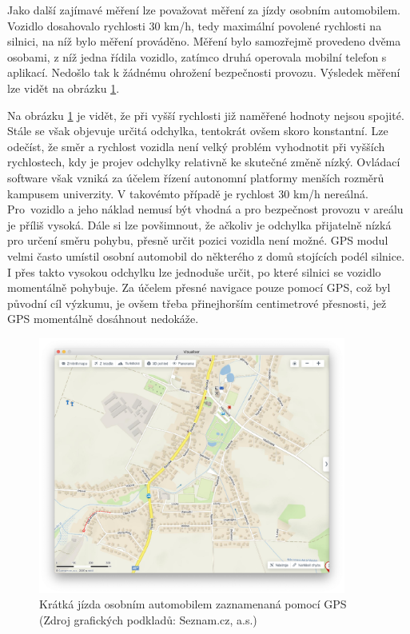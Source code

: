 \documentclass[czech, bachelor]{diploma}
\begin{document}
Jako další zajímavé měření lze považovat měření za jízdy osobním automobilem. Vozidlo dosahovalo rychlosti 30 km/h, tedy maximální
povolené rychlosti na silnici, na níž bylo měření prováděno. Měření bylo samozřejmě provedeno dvěma osobami, z níž
jedna řídila vozidlo, zatímco druhá operovala mobilní telefon s aplikací. Nedošlo tak k žádnému ohrožení bezpečnosti provozu.
Výsledek měření lze vidět na obrázku \ref{fig:olsinaautem}.

Na obrázku \ref{fig:olsinaautem} je vidět, že při vyšší rychlosti již naměřené hodnoty nejsou spojité. Stále se však objevuje
určitá odchylka, tentokrát ovšem skoro konstantní. Lze odečíst, že směr a rychlost vozidla není velký problém vyhodnotit při
vyšších rychlostech, kdy je projev odchylky relativně ke skutečné změně nízký. Ovládací software však vzniká za účelem řízení
autonomní platformy menších rozměrů kampusem univerzity. V takovémto případě je rychlost 30 km/h nereálná. Pro~vozidlo a jeho
náklad nemusí být vhodná a pro bezpečnost provozu v areálu je příliš vysoká. Dále si lze povšimnout, že ačkoliv je odchylka
přijatelně nízká pro určení směru pohybu, přesně určit pozici vozidla není možné. GPS modul velmi často umístil osobní automobil
do některého z domů stojících podél silnice. I přes takto vysokou odchylku lze jednoduše určit, po které silnici se vozidlo
momentálně pohybuje. Za účelem přesné navigace pouze pomocí GPS, což byl původní cíl výzkumu, je ovšem třeba přinejhorším
centimetrové přesnosti, jež GPS momentálně dosáhnout nedokáže.

\begin{figure}
    \centering
    \includegraphics[width=0.9\textwidth]{Figures/olsinaautem.png}
    \caption{Krátká jízda osobním automobilem zaznamenaná pomocí GPS (Zdroj grafických podkladů: Seznam.cz, a.s.)}
    \label{fig:olsinaautem}
\end{figure}
\end{document}
